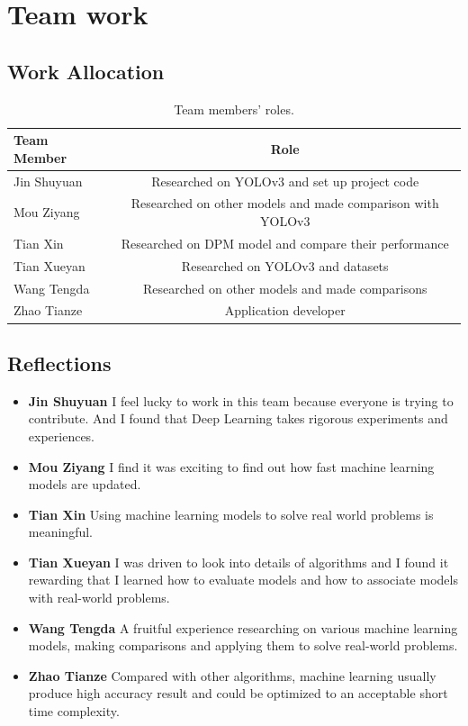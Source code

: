 \documentclass[letterpaper]{article} %
\begin{document}
\section{Team work}
\subsection{Work Allocation}
\begin{table}[ht!]
\centering
\resizebox{1\linewidth}{!}
{
\begin{tabular}{|l|c|}
\hline
\textbf{Team Member} &  \textbf{Role}  \\ \hline
Jin Shuyuan &  Researched on YOLOv3 and set up project code\\
\hline
Mou Ziyang & Researched on other models and made comparison with YOLOv3\\ \hline
Tian Xin & Researched on DPM model and compare their performance \\ \hline
Tian Xueyan & Researched on YOLOv3 and datasets \\ \hline
Wang Tengda & Researched on other models and made comparisons \\ \hline
Zhao Tianze & Application developer\\ \hline
\end{tabular}
}
\vspace{-2mm}
\caption{\footnotesize{Team members' roles.}}
\label{tab:time}\vspace{-1em}
\end{table}

\subsection{Reflections}
\begin{itemize}
    \item {\textbf{Jin Shuyuan}}
I feel lucky to work in this team because everyone is trying to contribute. And I found that Deep Learning takes rigorous experiments and experiences.
\item{\textbf{Mou Ziyang}}
I find it was exciting to find out how fast machine learning models are updated.
\item{\textbf{Tian Xin}}
Using machine learning models to solve real world problems is meaningful.
\item{\textbf{Tian Xueyan}}
I was driven to look into details of algorithms and I found it rewarding that I learned how to evaluate models and how to associate models with real-world problems.
\item{\textbf{Wang Tengda}}
A fruitful experience researching on various machine learning models, making comparisons and applying them to solve real-world problems. 
\item{\textbf{Zhao Tianze}}
Compared with other algorithms, machine learning usually produce high accuracy result and could be optimized to an acceptable short time complexity. 
\end{itemize}




\end{document}
